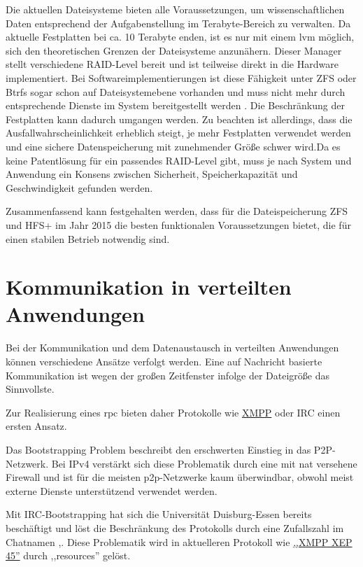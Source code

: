 \documentclass[oneside, ngerman, toc=bibliography,bibliography=totoc,listof=entryprefix, open=right,numbers=noenddot,fontsize=12pt]{scrbook}
\begin{document}
Die aktuellen Dateisysteme bieten alle Voraussetzungen, um wissenschaftlichen Daten entsprechend der Aufgabenstellung im Terabyte-Bereich zu verwalten. Da aktuelle Festplatten bei ca. 10 Terabyte enden, ist es nur mit einem \acrfull{lvm} möglich, sich den theoretischen Grenzen der Dateisysteme anzunähern. Dieser Manager stellt verschiedene RAID-Level bereit und ist teilweise direkt in die Hardware implementiert. Bei Softwareimplementierungen ist diese Fähigkeit unter {ZFS} oder {Btrfs} sogar schon auf Dateisystemebene vorhanden und muss nicht mehr durch entsprechende Dienste im System bereitgestellt werden \cite{zfsraid}.
Die Beschränkung der Festplatten kann dadurch umgangen werden.
Zu beachten ist allerdings, dass die Ausfallwahrscheinlichkeit erheblich steigt, je mehr Festplatten verwendet werden  und eine sichere Datenspeicherung mit zunehmender Größe schwer wird.Da es keine Patentlösung für ein passendes RAID-Level gibt, muss je nach System und Anwendung ein Konsens zwischen Sicherheit, Speicherkapazität und Geschwindigkeit gefunden werden.

Zusammenfassend kann festgehalten werden, dass für die Dateispeicherung {ZFS} und {HFS+} im Jahr 2015 die besten funktionalen Voraussetzungen bietet, die für einen stabilen Betrieb notwendig sind. 


\section{Kommunikation in verteilten Anwendungen}\label{sec:comm}
Bei der Kommunikation und  dem Datenaustausch in verteilten Anwendungen können verschiedene Ansätze verfolgt werden. Eine auf Nachricht basierte Kommunikation ist wegen der großen Zeitfenster infolge der Dateigröße das Sinnvollste.

Zur Realisierung eines \acrfull{rpc} bieten daher Protokolle wie \href{http://xmpp.org/}{XMPP}  oder IRC einen ersten Ansatz.

Das Bootstrapping Problem beschreibt den erschwerten Einstieg in das P2P-Netzwerk. Bei IPv4 verstärkt sich diese Problematik durch eine mit \acrfull{nat} versehene Firewall und ist für die meisten \acrshort{p2p}-Netzwerke kaum überwindbar, obwohl meist externe Dienste unterstützend verwendet werden.

Mit IRC-Bootstrapping hat sich die Universität Duisburg-Essen bereits beschäftigt und löst die Beschränkung des Protokolls durch eine Zufallszahl im Chatnamen \cite{5159226},\cite{RFC2812}. Diese Problematik wird in aktuelleren Protokoll wie \href{http://xmpp.org/extensions/xep-0045.html\#enter-conflict}{,,XMPP XEP 45''} durch ,,resources'' gelöst.
\end{document}
